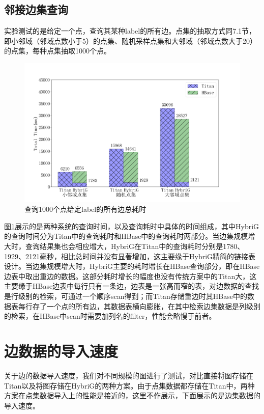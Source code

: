 \subsection{邻接边集查询}
实验测试的是给定一个点，查询其某种label的所有边。点集的抽取方式同7.1节，即小邻域（邻域点数小于5）的点集、随机采样点集和大邻域（邻域点数大于20）的点集，每种点集抽取1000个点。

\begin{figure}[htbp]
\centering
\includegraphics[width=140mm]{fig/get_edges.png}
\caption{查询1000个点给定label的所有边总耗时}
\label{fig:get_edges}
\end{figure}

图\ref{fig:get_edges}展示的是两种系统的查询时间，以及查询耗时中具体的时间组成，其中HybriG的查询时间分为Titan中的查询耗时和HBase中的查询耗时两部分。当边集规模增大时，查询结果集也会相应增大，HybriG在Titan中的查询耗时分别是1780、1929、2121毫秒，相比总时间并没有显著增加，这主要缘于HybriG精简的链接表设计。当边集规模增大时，HybriG主要的耗时增长在HBase查询部分，即在HBase边表中取出重边的数据。这部分耗时增长的幅度也没有传统方案中的Titan大，这主要缘于HBase边表中每行只有一条边，边表是一张高而窄的表，对边数据的查找是行级别的检索，可通过一个顺序scan得到；而Titan存储重边时其HBase中的数据表每行存了一个点的所有边，其数据表横向膨胀，在其中检索边集数据是列级别的检索，在HBase中scan时需要加列名的filter，性能会略慢于前者。

\section{边数据的导入速度}
关于边的数据导入速度，我们对不同规模的图进行了测试，对比直接将图存储在Titan以及将图存储在HybriG的两种方案。由于点集数据都存储在Titan中，两种方案在点集数据导入上的性能是接近的，这里不作展示，下面展示的是边集数据的导入速度。

